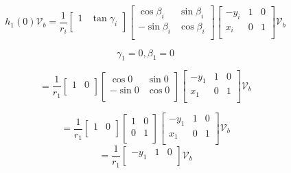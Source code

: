 \documentclass{article}
\begin{document}
\begin{equation}
    h_1(0) \mathcal{V}_b = \frac{1}{r_i} \left[\begin{array}{cc}
            1 & \tan\gamma_i \\
        \end{array}\right]
    \left[\begin{array}{cc}
            \cos \beta_i  & \sin \beta_i \\
            -\sin \beta_i & \cos \beta_i \\
        \end{array}\right]
    \begin{bmatrix}
        -y_i & 1 & 0 \\
        x_i  & 0 & 1 \\
    \end{bmatrix} \mathcal{V}_b
\end{equation}

\begin{equation*}
    \gamma_1 = 0, \beta_1 = 0
\end{equation*}

\begin{equation}
    = \frac{1}{r_1} \left[\begin{array}{cc}
            1 & 0 \\
        \end{array}\right]
    \left[\begin{array}{cc}
            \cos 0  & \sin 0 \\
            -\sin 0 & \cos 0 \\
        \end{array}\right]
    \begin{bmatrix}
        -y_1 & 1 & 0 \\
        x_1  & 0 & 1 \\
    \end{bmatrix}
    \mathcal{V}_b
\end{equation}

\begin{equation}
    = \frac{1}{r_1} \left[\begin{array}{cc}
            1 & 0 \\
        \end{array}\right]
    \begin{bmatrix}
        1 & 0 \\
        0 & 1 \\
    \end{bmatrix}
    \begin{bmatrix}
        -y_1 & 1 & 0 \\
        x_1  & 0 & 1 \\
    \end{bmatrix}
    \mathcal{V}_b
\end{equation}
\begin{equation}
    = \frac{1}{r_1}
    \begin{bmatrix}
        -y_1 & 1 & 0 \\
    \end{bmatrix}
    \mathcal{V}_b
\end{equation}
\end{document}
